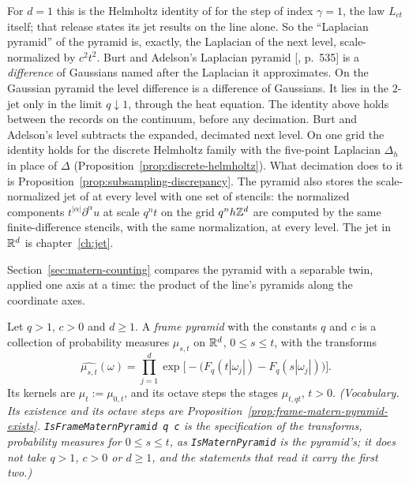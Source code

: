For $d = 1$ this is the Helmholtz identity of  for the
\Matern{} step of index $\gamma = 1$, the law $L_{ct}$ itself; that release states its jet results
on the line alone. So the ``Laplacian pyramid'' of the \Matern{} pyramid is, exactly, the Laplacian
of the next level, scale-normalized by $c^2t^2$. Burt and Adelson's Laplacian pyramid
[, p.~535] is a \emph{difference} of Gaussians named after the Laplacian
it approximates.
On the Gaussian pyramid the level difference is a difference of Gaussians. It lies in the
$2$-jet only in the limit $q \downarrow 1$, through the heat equation. The identity above holds
between the records on the continuum, before any decimation. Burt and Adelson's level subtracts the
expanded, decimated next level. On one grid the
identity holds for the discrete Helmholtz family with the five-point Laplacian $\Delta_h$ in place
of $\Delta$ (Proposition~\ref{prop:discrete-helmholtz}). What decimation does to it is
Proposition~\ref{prop:subsampling-discrepancy}. The pyramid also stores the scale-normalized jet of
 at every level with one set of stencils: the normalized components
$t^{|\alpha|}\partial^\alpha u$ at scale $q^nt$ on the grid $q^nh\mathbb{Z}^d$ are computed by the same
finite-difference stencils, with the same normalization, at every level. The jet in $\mathbb{R}^d$ is
chapter~\ref{ch:jet}.

Section~\ref{sec:matern-counting} compares the \Matern{} pyramid with a separable twin, applied one
axis at a time: the product of the line's \Matern{} pyramids along the coordinate axes.

\begin{definition}
\label{def:frame-matern-pyramid}
\leanok
{}
Let $q > 1$, $c > 0$ and $d \ge 1$. A \emph{frame \Matern{} pyramid} with the constants $q$ and $c$
is a collection of probability measures $\mu_{s,t}$ on $\mathbb{R}^d$, $0 \le s \le t$, with the transforms
\[
  \widehat{\mu_{s,t}}(\omega)
   = \prod_{j=1}^d\exp\bigl[-\bigl(F_q(t|\omega_j|) - F_q(s|\omega_j|)\bigr)\bigr] .
\]
Its kernels are $\mu_t := \mu_{0,t}$, and its octave steps the stages $\mu_{t,qt}$, $t > 0$.
\statusT\quad\emph{(Vocabulary. Its existence and its octave steps are
Proposition~\ref{prop:frame-matern-pyramid-exists}. \texttt{IsFrameMaternPyramid q c} is the
specification of the transforms, probability measures for $0 \le s \le t$, as
\texttt{IsMaternPyramid} is the \Matern{} pyramid's; it does not take $q > 1$, $c > 0$ or
$d \ge 1$, and the statements that read it carry the first two.)}
\end{definition}

